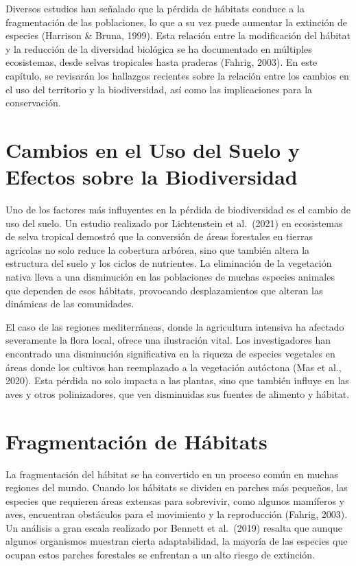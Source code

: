 \documentclass[
  letterpaper,
  DIV=11,
  numbers=noendperiod,
  oneside]{scrreprt}
\begin{document}
Diversos estudios han señalado que la pérdida de hábitats conduce a la
fragmentación de las poblaciones, lo que a su vez puede aumentar la
extinción de especies (Harrison \& Bruna, 1999). Esta relación entre la
modificación del hábitat y la reducción de la diversidad biológica se ha
documentado en múltiples ecosistemas, desde selvas tropicales hasta
praderas (Fahrig, 2003). En este capítulo, se revisarán los hallazgos
recientes sobre la relación entre los cambios en el uso del territorio y
la biodiversidad, así como las implicaciones para la conservación.

\section{Cambios en el Uso del Suelo y Efectos sobre la
Biodiversidad}\label{cambios-en-el-uso-del-suelo-y-efectos-sobre-la-biodiversidad}

Uno de los factores más influyentes en la pérdida de biodiversidad es el
cambio de uso del suelo. Un estudio realizado por Lichtenstein et
al.~(2021) en ecosistemas de selva tropical demostró que la conversión
de áreas forestales en tierras agrícolas no solo reduce la cobertura
arbórea, sino que también altera la estructura del suelo y los ciclos de
nutrientes. La eliminación de la vegetación nativa lleva a una
disminución en las poblaciones de muchas especies animales que dependen
de esos hábitats, provocando desplazamientos que alteran las dinámicas
de las comunidades.

El caso de las regiones mediterráneas, donde la agricultura intensiva ha
afectado severamente la flora local, ofrece una ilustración vital. Los
investigadores han encontrado una disminución significativa en la
riqueza de especies vegetales en áreas donde los cultivos han
reemplazado a la vegetación autóctona (Mas et al., 2020). Esta pérdida
no solo impacta a las plantas, sino que también influye en las aves y
otros polinizadores, que ven disminuidas sus fuentes de alimento y
hábitat.

\section{Fragmentación de
Hábitats}\label{fragmentaciuxf3n-de-huxe1bitats-1}

La fragmentación del hábitat se ha convertido en un proceso común en
muchas regiones del mundo. Cuando los hábitats se dividen en parches más
pequeños, las especies que requieren áreas extensas para sobrevivir,
como algunos mamíferos y aves, encuentran obstáculos para el movimiento
y la reproducción (Fahrig, 2003). Un análisis a gran escala realizado
por Bennett et al.~(2019) resalta que aunque algunos organismos muestran
cierta adaptabilidad, la mayoría de las especies que ocupan estos
parches forestales se enfrentan a un alto riesgo de extinción.
\end{document}
